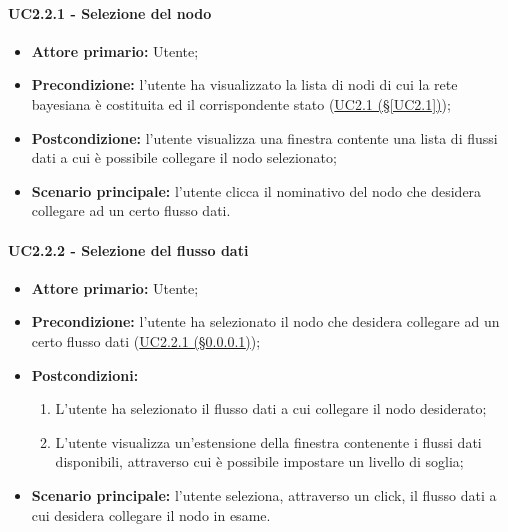 \paragraph{UC2.2.1 - Selezione del nodo}\label{UC2.2.1}
\begin{itemize}
\item \textbf{Attore primario:} Utente;
\item \textbf{Precondizione:} l'utente ha visualizzato la lista di nodi di cui la rete bayesiana è costituita ed il 	corrispondente stato (\hyperref[UC2.1]{UC2.1 (§\ref*{UC2.1})});
\item \textbf{Postcondizione:} l'utente visualizza una finestra contente una lista di flussi dati a cui è possibile 	collegare il nodo selezionato;
\item \textbf{Scenario principale:} l'utente clicca il nominativo del nodo che desidera collegare ad un certo flusso dati.
\end{itemize}

\paragraph{UC2.2.2 - Selezione del flusso dati}\label{UC2.2.2}
\begin{itemize}
\item \textbf{Attore primario:} Utente;
\item \textbf{Precondizione:} l'utente ha selezionato il nodo che desidera collegare ad un certo flusso dati 					(\hyperref[UC2.2.1]{UC2.2.1 (§\ref*{UC2.2.1})});
\item \textbf{Postcondizioni:}
	\begin{enumerate}
	\item L'utente ha selezionato il flusso dati a cui collegare il nodo desiderato;
	\item L'utente visualizza un'estensione della finestra contenente i flussi dati disponibili, attraverso cui è 					possibile impostare un livello di soglia;
	\end{enumerate}
\item \textbf{Scenario principale:} l'utente seleziona, attraverso un click, il flusso dati a cui desidera 						collegare il nodo in esame.
\end{itemize}

